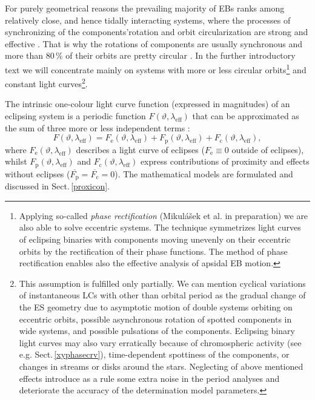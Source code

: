 \documentclass{aa}
\newcommand{\lef}{\lambda_{\mathrm{eff}}}
\begin{document}
For purely geometrical reasons the prevailing majority of EBs ranks among relatively close, and hence tidally interacting systems, where the processes of synchronizing of the components'rotation and orbit circularization are strong and effective \citep[][and references therein]{zahn,goldma}. That is why the rotations of components are usually synchronous and more than 80\,\% of their orbits are pretty circular \citep[see CALEB,][]{BM3}. In the further introductory text we will concentrate mainly on systems with more or less circular orbits\footnote{Applying so-called \textit{phase rectification} (Mikul\'a\v{s}ek et al. in preparation) we are also able to solve eccentric systems. The technique symmetrizes light curves of eclipsing binaries with components moving unevenly on their eccentric orbits by the rectification of their phase functions. The method of phase rectification enables also the effective analysis of apsidal EB motion.} \label{rector} and constant light curves\footnote{This assumption is fulfilled only partially. We can mention cyclical variations of instantaneous LCs with other than orbital period as the gradual change of the ES geometry due to asymptotic motion of double systems orbiting on eccentric orbits, possible asynchronous rotation of spotted components in wide systems, and possible pulsations of the components. Eclipsing binary light curves may also vary erratically because of chromospheric activity (see e.g. Sect.\,\ref{xyphasecrv}), time-dependent spottiness of the components, or changes in streams or disks around the stars.
Neglecting of above mentioned effects introduce as a rule some extra noise in the period analyses and deteriorate the accuracy of the determination model parameters.}.

The intrinsic one-colour light curve function (expressed in magnitudes) of an eclipsing system is a periodic function $F(\vartheta,\lef)$ that can be approximated as the sum of three more or less independent terms \citep[see also in][]{and12}:
\begin{equation}\label{EBbas}
F(\vartheta,\lef)=F_{\mathrm e}(\vartheta,\lef)+F_{\mathrm p}(\vartheta,\lef)+F_{\mathrm c}(\vartheta,\lef),
\end{equation}
where $F_{\mathrm{e}}(\vartheta,\lef)$ describes a light curve of eclipses  ($F_{\mathrm{e}}\equiv 0$ outside of eclipses), whilst $F_{\mathrm{p}}(\vartheta,\lef)$ and $F_{\mathrm{c}}(\vartheta,\lef)$ express contributions of proximity and \citet{con} effects without eclipses ($\overline{F_{\mathrm p}}=\overline{F_{\mathrm c}}=0$). The mathematical models are formulated and discussed in Sect.\,\ref{proxicon}.
\end{document}
